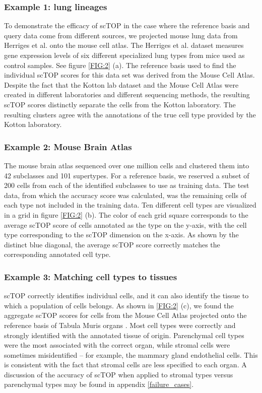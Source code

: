 \documentclass[aps,superscriptaddress, notitlepage,longbibliography]{revtex4-1}
\begin{document}
\subsubsection{Example 1: lung lineages}
To demonstrate the efficacy of scTOP in the case where the reference basis and query data come from different sources, we projected mouse lung data from Herriges et al. \cite{herriges_durable_2022} onto the mouse cell atlas. The Herriges et al. dataset  measures gene expression levels of six different specialized lung types from mice used as control samples. See figure \ref{FIG:2} (a). The reference basis used to find the individual scTOP scores for this data set was derived from the Mouse Cell Atlas. Despite the fact that the Kotton lab dataset and the Mouse Cell Atlas were created in different laboratories and different sequencing methods, the resulting scTOP scores distinctly separate the cells from the Kotton laboratory. The resulting clusters agree with the annotations of the true cell type provided by the Kotton laboratory.

\subsubsection{Example 2: Mouse Brain Atlas}

The mouse brain atlas\cite{yao_taxonomy_2021} sequenced over one million cells and clustered them into 42 subclasses and 101 supertypes. For a reference basis, we reserved a subset of 200 cells from each of the identified subclasses to use as training data. The test data, from which the accuracy score was calculated, was the remaining cells of each type not included in the training data. Ten different cell types are visualized in a grid in figure \ref{FIG:2} (b). The color of each grid square corresponds to the average scTOP score of cells annotated as the type on the y-axis, with the cell type corresponding to the scTOP dimension on the x-axis. As shown by the distinct blue diagonal, the average scTOP score correctly matches the corresponding annotated cell type.

\subsubsection{Example 3: Matching cell types to tissues}

scTOP correctly identifies individual cells, and it can also identify the tissue to which a population of cells belongs. As shown in \ref{FIG:2} (c), we found the aggregate scTOP scores for cells from the Mouse Cell Atlas projected onto the reference basis of Tabula Muris organs \cite{schaum_single-cell_2018}. Most cell types were correctly and strongly identified with the annotated tissue of origin. Parenchymal cell types were the most associated with the correct organ, while stromal cells were sometimes misidentified -- for example, the mammary gland endothelial cells. This is consistent with the fact that stromal cells are less specified to each organ. A discussion of the accuracy of scTOP when applied to stromal types versus parenchymal types may be found in appendix \ref{failure_cases}.
\end{document}
